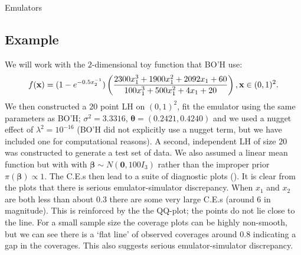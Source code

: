 \begin{chapter}{Emulators \label{Ch:Emulators}}
\subsection{Example}
We will work with the $2$-dimensional toy function that BO'H use:
\begin{equation}
  f(\mathbf{x}) = (1-e^{-0.5x_2^{-1}})\left( \frac{2300x_1^3 + 1900 x_1^2 + 2092 x_1 + 60}{100 x_1^3 + 500x_1^2 + 4x_1 + 20} \right), \mathbf{x} \in (0,1)^2.
\end{equation}
We then constructed a $20$ point LH on $(0,1)^2$, fit the emulator using the same parameters as BO'H; $\sigma^2 = 3.3316$, $\bm{\theta} = (0.2421, 0.4240)$ and we used a nugget effect of $\lambda^2 = 10^{-16}$ (BO'H did not explicitly use a nugget term, but we have included one for computational reasons). A second, independent LH of size $20$ was constructed to generate a test set of data. We also assumed a linear mean function but with with $\bm{\beta} \sim N(\bm{0}, 100I_3)$ rather than the improper prior $\pi(\bm{\beta}) \propto 1$. The C.E.s then lead to a suite of diagnostic plots (). It is clear from the plots that there is serious emulator-simulator discrepancy. When $x_1$ and $x_2$ are both less than about $0.3$ there are some very large C.E.s (around $6$ in magnitude). This is reinforced by the the QQ-plot; the points do not lie close to the line. For a small sample size the coverage plots can be highly non-smooth, but we can see there is a `flat line' of observed coverages around $0.8$ indicating a gap in the coverages. This also suggests serious emulator-simulator discrepancy.
 \begin{figure}[h]
   \centering

\end{figure}
\end{chapter}
